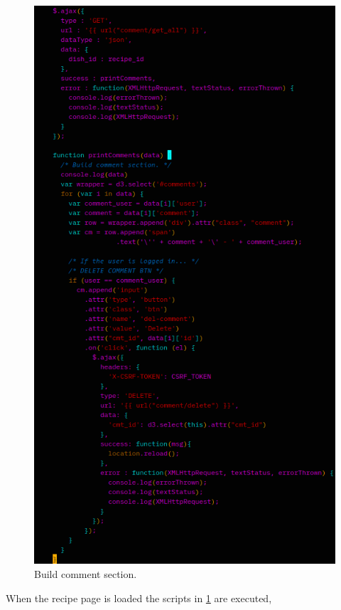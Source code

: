 \documentclass[a4paper]{scrartcl}
\begin{document}
\begin{figure}[H]
  \begin{center}
    \includegraphics[scale=1.0]{images/build_cmt.png}
    \caption{Build comment section.}
    \label{fig:build}
  \end{center}
\end{figure}
\noindent
When the recipe page is loaded the scripts in \ref{fig:build} are executed,
\end{document}
